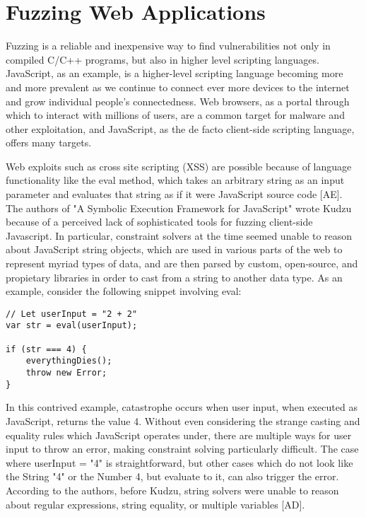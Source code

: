 \documentclass[11pt,expanded,copyright]{fsuthesis}
\begin{document}

\section{Fuzzing Web Applications}

Fuzzing is a reliable and inexpensive way to find vulnerabilities not only in compiled C/C++ programs, but also in higher level scripting languages. JavaScript, as an example, is a higher-level scripting language becoming more and more prevalent as we continue to connect ever more devices to the internet and grow individual people's connectedness. Web browsers, as a portal through which to interact with millions of users, are a common target for malware and other exploitation, and JavaScript, as the de facto client-side scripting language, offers many targets. 

Web exploits such as cross site scripting (XSS) are possible because of language functionality like the eval method, which takes an arbitrary string as an input parameter and evaluates that string as if it were JavaScript source code [AE]. The authors of "A Symbolic Execution Framework for JavaScript" wrote Kudzu because of a perceived lack of sophisticated tools for fuzzing client-side Javascript. In particular, constraint solvers at the time seemed unable to reason about JavaScript string objects, which are used in various parts of the web to represent myriad types of data, and are then parsed by custom, open-source, and propietary libraries in order to cast from a string to another data type. As an example, consider the following snippet involving eval:

\begin{lstlisting}[style=jsstyle]
// Let userInput = "2 + 2"
var str = eval(userInput); 

if (str === 4) {
	everythingDies();
	throw new Error;
}
\end{lstlisting}

In this contrived example, catastrophe occurs when user input, when executed as JavaScript, returns the value 4. Without even considering the strange casting and equality rules which JavaScript operates under, there are multiple ways for user input to throw an error, making constraint solving particularly difficult. The case where userInput = "4" is straightforward, but other cases which do not look like the String "4" or the Number 4, but evaluate to it, can also trigger the error. According to the authors, before Kudzu, string solvers were unable to reason about regular expressions, string equality, or multiple variables [AD].
\end{document}
